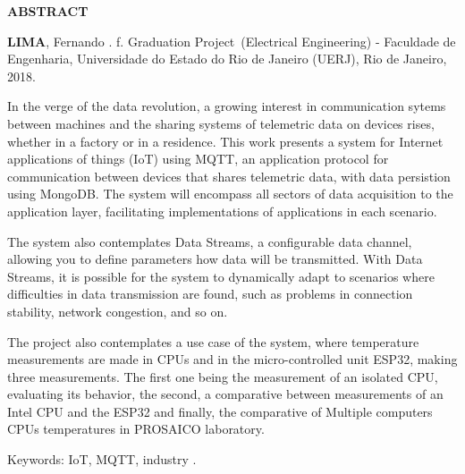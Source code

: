 \begin{center}
\textbf{ABSTRACT}
\end{center}

$\!$\\

\hspace{-1.3cm}\textbf{LIMA}, Fernando \textit{\setTituloEnglish}. \pageref{LastPage} f. Graduation Project~(Electrical Engineering) - Faculdade de Engenharia, Universidade do Estado do Rio de Janeiro (UERJ), Rio de Janeiro, 2018.

\vspace{.2cm}


In the verge of the data revolution, a growing interest in communication sytems between machines and the sharing systems of telemetric data on devices rises, whether in a factory or in a residence. This work presents a system for Internet applications of things (IoT) using MQTT, an application protocol for communication between devices that shares telemetric data, with data persistion using MongoDB. The system will  encompass all sectors of data acquisition to the application layer, facilitating implementations of applications in each scenario.

The system also contemplates Data Streams, a configurable data channel, allowing you to define parameters how data will be transmitted. With Data Streams, it is possible for the system to dynamically adapt to scenarios where difficulties in data transmission are found, such as problems in connection stability, network congestion, and so on.

The project also contemplates a use case of the system, where temperature measurements are made in CPUs and in the micro-controlled unit ESP32, making three measurements. The first one being the measurement of an isolated CPU, evaluating its behavior, the second, a comparative between measurements of an Intel CPU and the ESP32 and finally, the comparative of Multiple computers CPUs temperatures in PROSAICO laboratory.

\vspace{1cm}

\hspace{-1.3cm}Keywords: IoT, MQTT, industry .
